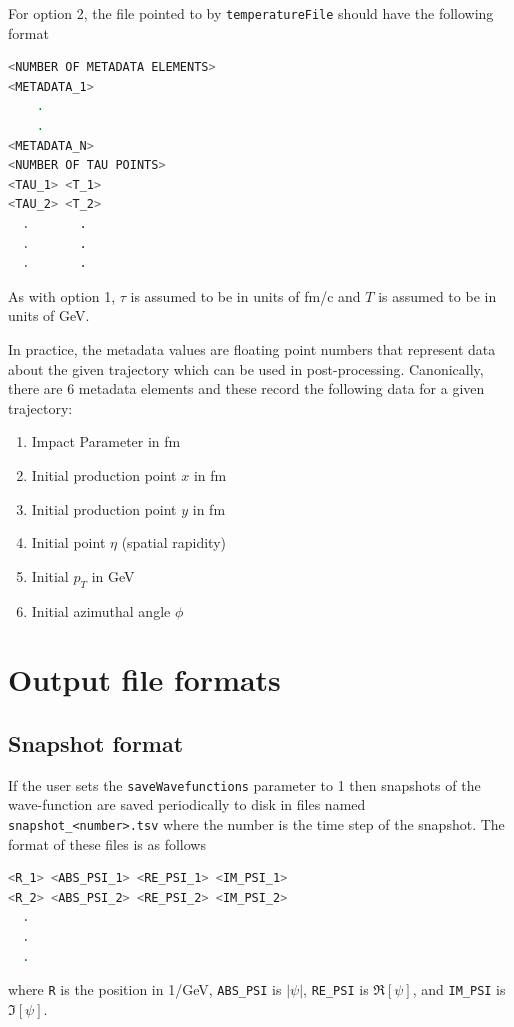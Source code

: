 \documentclass[times,sort&compress,final]{elsarticle}
\begin{document}
For option 2, the file pointed to by {\tt temperatureFile} should have the following format
%
\begin{lstlisting}[language=bash]
<NUMBER OF METADATA ELEMENTS>
<METADATA_1>
    .
    .
<METADATA_N>
<NUMBER OF TAU POINTS>
<TAU_1> <T_1>
<TAU_2> <T_2>
  .       .
  .       .
  .       .
\end{lstlisting}
%
As with option 1, $\tau$ is assumed to be in units of fm/c and $T$ is assumed to be in units of GeV.

In practice, the metadata values are floating point numbers that represent data about the given trajectory which can be used in post-processing.  Canonically, there are 6 metadata elements and these record the following data for a given trajectory: 
%
\begin{enumerate}
    \item{Impact Parameter in fm}
    \item{Initial production point $x$ in fm}
    \item{Initial production point $y$ in fm}
    \item{Initial point $\eta$ (spatial rapidity)}
    \item{Initial $p_T$ in GeV}
    \item{Initial azimuthal angle $\phi$}
\end{enumerate}

\section{Output file formats}
\label{sec:outputformats}

\subsection{Snapshot format}

If the user sets the {\tt saveWavefunctions} parameter to 1 then snapshots of the wave-function are saved periodically to disk in files named {\tt snapshot\_<number>.tsv} where the number is the time step of the snapshot.  The format of these files is as follows
%
\begin{lstlisting}[language=bash]
<R_1> <ABS_PSI_1> <RE_PSI_1> <IM_PSI_1>
<R_2> <ABS_PSI_2> <RE_PSI_2> <IM_PSI_2>
  .       
  .
  .
\end{lstlisting}
%
where {\tt R} is the position in 1/GeV, {\tt ABS\_PSI} is $|\psi|$, {\tt RE\_PSI} is $\Re[\psi]$, and {\tt IM\_PSI} is $\Im[\psi]$.
\end{document}
